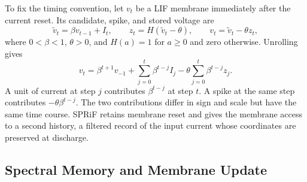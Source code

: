 \documentclass[letterpaper,journal]{IEEEtran}
\begin{document}
To fix the timing convention, let $v_t$ be a LIF membrane immediately after the current reset. Its candidate, spike, and stored voltage are
\begin{equation}
\widetilde v_t=\beta v_{t-1}+I_t,\qquad
z_t=H(\widetilde v_t-\theta),\qquad
v_t=\widetilde v_t-\theta z_t,
\label{eq:lif}
\end{equation}
where $0<\beta<1$, $\theta>0$, and $H(a)=1$ for $a\geq0$ and zero otherwise. Unrolling gives
\begin{equation}
v_t=\beta^{t+1}v_{-1}
+\sum_{j=0}^{t}\beta^{t-j} I_j
-\theta\sum_{j=0}^{t}\beta^{t-j}z_j.
\label{eq:lif_unrolled}
\end{equation}
A unit of current at step $j$ contributes $\beta^{t-j}$ at step $t$. A spike at the same step contributes $-\theta\beta^{t-j}$. The two contributions differ in sign and scale but have the same time course. SPRiF retains membrane reset and gives the membrane access to a second history, a filtered record of the input current whose coordinates are preserved at discharge.

\subsection{Spectral Memory and Membrane Update}
\label{sec:forward}
\end{document}
